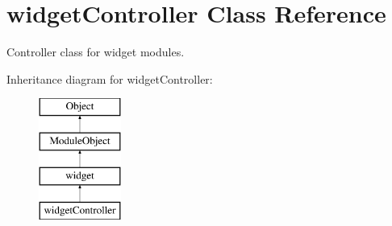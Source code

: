\hypertarget{classwidgetController}{}\section{widget\+Controller Class Reference}
\label{classwidgetController}


Controller class for widget modules.  


Inheritance diagram for widget\+Controller\+:\begin{figure}[H]
\begin{center}
\leavevmode
\includegraphics[height=4.000000cm]{classwidgetController}
\end{center}
\end{figure}
